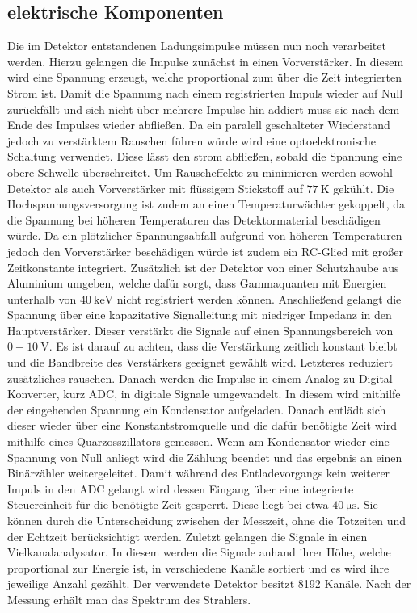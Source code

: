 \subsection{elektrische Komponenten}
Die im Detektor entstandenen Ladungsimpulse müssen nun noch verarbeitet werden. Hierzu gelangen die Impulse zunächst in einen Vorverstärker. In diesem wird eine Spannung erzeugt, welche proportional zum über die Zeit integrierten Strom ist. Damit die Spannung nach einem registrierten Impuls wieder auf Null zurückfällt und sich nicht über mehrere Impulse hin addiert muss sie nach dem Ende des Impulses wieder abfließen. Da ein paralell geschalteter Wiederstand jedoch zu verstärktem Rauschen führen würde wird eine optoelektronische Schaltung verwendet. Diese lässt den strom abfließen, sobald die Spannung eine obere Schwelle überschreitet. Um Rauscheffekte zu minimieren werden sowohl Detektor als auch Vorverstärker mit flüssigem Stickstoff auf $\SI{77}{\kelvin}$ gekühlt. Die Hochspannungsversorgung ist zudem an einen Temperaturwächter gekoppelt, da die Spannung bei höheren Temperaturen das Detektormaterial beschädigen würde. Da ein plötzlicher Spannungsabfall aufgrund von höheren Temperaturen jedoch den Vorverstärker beschädigen würde ist zudem ein RC-Glied mit großer Zeitkonstante integriert. Zusätzlich ist der Detektor von einer Schutzhaube aus Aluminium umgeben, welche dafür sorgt, dass Gammaquanten mit Energien unterhalb von $\SI{40}{\kilo\electronvolt}$ nicht registriert werden können. Anschließend gelangt die Spannung über eine kapazitative Signalleitung mit niedriger Impedanz in den Hauptverstärker. Dieser verstärkt die Signale auf einen Spannungsbereich von $0 - \SI{10}{\volt}$. Es ist darauf zu achten, dass die Verstärkung zeitlich konstant bleibt und die Bandbreite des Verstärkers geeignet gewählt wird. Letzteres reduziert zusätzliches rauschen. Danach werden die Impulse in einem Analog zu Digital Konverter, kurz ADC, in digitale Signale umgewandelt. In diesem wird mithilfe der eingehenden Spannung ein Kondensator aufgeladen. Danach entlädt sich dieser wieder über eine Konstantstromquelle und die dafür benötigte Zeit wird mithilfe eines Quarzosszillators gemessen. Wenn am Kondensator wieder eine Spannung von Null anliegt wird die Zählung beendet und das ergebnis an einen Binärzähler weitergeleitet. Damit während des Entladevorgangs kein weiterer Impuls in den ADC gelangt wird dessen Eingang über eine integrierte Steuereinheit für die benötigte Zeit gesperrt. Diese liegt bei etwa $\SI{40}{\micro\second}$. Sie können durch die Unterscheidung zwischen der Messzeit, ohne die Totzeiten und der Echtzeit berücksichtigt werden. Zuletzt gelangen die Signale in einen Vielkanalanalysator. In diesem werden die Signale anhand ihrer Höhe, welche proportional zur Energie ist, in verschiedene Kanäle sortiert und es wird ihre jeweilige Anzahl gezählt. Der verwendete Detektor besitzt 8192 Kanäle. Nach der Messung erhält man das Spektrum des Strahlers.


